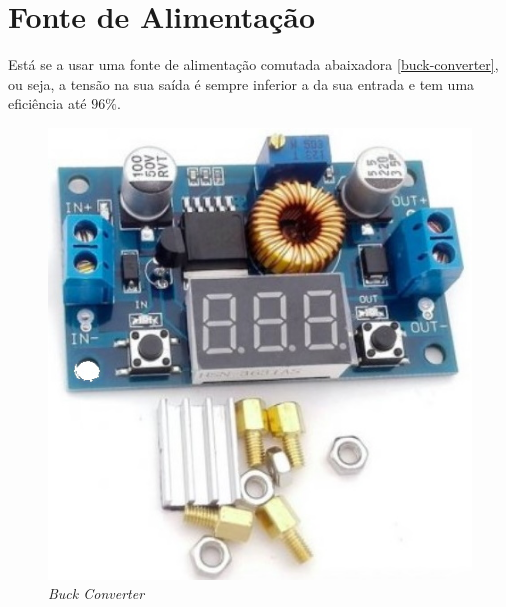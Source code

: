 \section{Fonte de Alimentação}
Está se a usar uma fonte de alimentação comutada abaixadora \autoref{buck-converter}, ou seja, a tensão na sua saída é sempre inferior a da sua entrada e tem uma eficiência até $96\%$.\\
\begin{minipage}[!b]{.5\linewidth}
	\begin{figure}[H]
		\captionsetup{justification=raggedright,singlelinecheck=false}
		\flushleft
		\includegraphics[scale=0.5]{./image/PESTA/material/DCDC_converter.jpg}
		\caption{\textit{Buck Converter}}
		\label{buck-converter}
	\end{figure}
\end{minipage}
